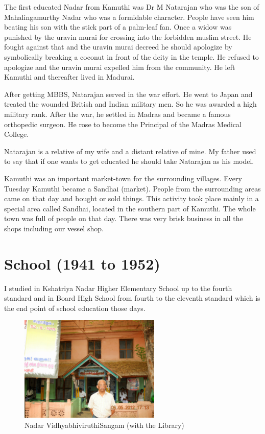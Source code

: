 The first educated Nadar from Kamuthi was Dr M Natarajan who was the son 
of Mahalingamurthy Nadar who was a formidable character. People have 
seen him beating his son with the stick part of a palm-leaf fan. Once a 
widow was punished by the uravin murai for crossing into the forbidden 
muslim street. He fought against that and the uravin murai decreed he 
should apologize by symbolically breaking a coconut in front of the 
deity in the temple. He refused to apologize and the uravin murai 
expelled him from the community. He left Kamuthi and thereafter lived in 
Madurai.

After getting MBBS, Natarajan served in the war effort. He went to Japan 
and treated the wounded British and Indian mili\-tary men. So he was 
awarded a high military rank. After the war, he settled in Madras and 
became a famous orthopedic surgeon. He rose to become the Principal of 
the Madras Medical College.

Natarajan is a relative of my wife and a distant relative of mine. My 
father used to say that if one wants to get educated he should take 
Natarajan as his model.

Kamuthi was an important market-town for the surrounding villages. Every 
Tuesday Kamuthi became a Sandhai (market). People from the surrounding 
areas came on that day and bought or sold things. This activity took 
place mainly in a special area called Sandhai, located in the southern 
part of Kamuthi. The whole town was full of people on that day. There 
was very brisk business in all the shops including our vessel shop.

\section*{School (1941 to 1952)}

I studied in Kshatriya Nadar Higher Elementary School up to the fourth
standard and in Board High School from fourth to the eleventh standard
which is the end point of school education those days.
\medskip

\begin{figure}[H]
\centering
\includegraphics[width=0.6\textwidth]{images/new-images/03-Rajaji-lib.jpg}
\caption{Nadar Vidhyabhiviruthi\break Sangam (with the Library)}
\end{figure}


